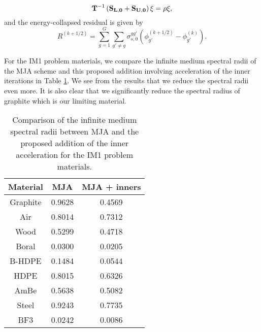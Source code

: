 \begin{enumerate}
\begin{enumerate}
		\begin{equation*}
	        {\bf T}^{-1} \left( {\bf S_{L,0}} + {\bf S_{U,0}} \right)\xi = \rho \xi ,
	        \end{equation*}
		  and the energy-collapsed residual is given by
		  \begin{equation*}
	        R^{(k+1/2)} = \sum_{g=1}^{G} \sum_{g' \neq g} \sigma_{s,0}^{gg'} \left( \phi_{g'}^{(k+1/2)} - \phi_{g'}^{(k)}\right).
	        \end{equation*}
	\end{enumerate}
For the IM1 problem materials, we compare the infinite medium spectral radii of the MJA scheme and this proposed addition involving acceleration of the inner iterations in Table \ref{tab::Conc_MJA_inners}. We see from the results that we reduce the spectral radii even more. It is also clear that we significantly reduce the spectral radius of graphite which is our limiting material.
\begin{table}
\caption{Comparison of the infinite medium spectral radii between MJA and the proposed addition of the inner acceleration for the IM1 problem materials.}
\begin{center}
\def\arraystretch{1.6}
\begin{tabular}{|c|c|c|}
\hline
Material & MJA & MJA + inners \\\hline \hline
Graphite&0.9628&0.4569\\\hline
Air&0.8014&0.7312\\\hline
Wood&0.5299&0.4718\\\hline
Boral&0.0300&0.0205\\\hline
B-HDPE&0.1484&0.0544\\\hline
HDPE&0.8015&0.6326\\\hline
AmBe&0.5638&0.5082\\\hline
Steel&0.9243&0.7735\\\hline
BF3&0.0242&0.0086\\\hline
\end{tabular}
\end{center}
\label{tab::Conc_MJA_inners}
\end{table}
\end{enumerate}